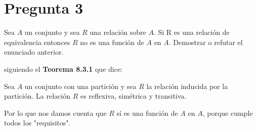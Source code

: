 \documentclass{exam}
\begin{document}
    \section*{Pregunta 3}

    Sea $A$ un conjunto y sea $R$ una relación sobre $A$. Si R es una relación de equivalencia entonces
    $R$ no es una función de $A$ en $A$. Demostrar o refutar el enunciado anterior. \newline

    siguiendo el \textbf{Teorema 8.3.1} que dice: \newline

    Sea $A$ un conjunto con una partición y sea $R$ la relación inducida por la
    partición. La relación $R$ es reflexiva, simétrica y transitiva. \newline

    Por lo que nos damos cuenta que $R$ sí es una función de $A$ en $A$, porque cumple todos los 
    "requisitos".

    
\end{document}
